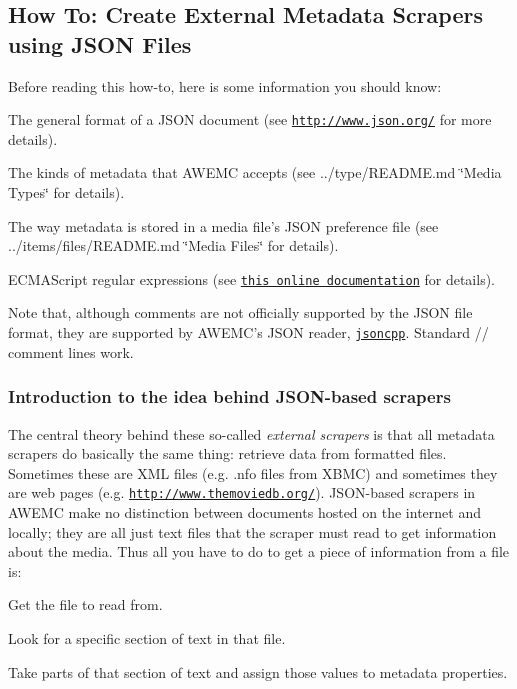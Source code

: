 \subsection*{How To\-: Create External Metadata Scrapers using J\-S\-O\-N Files}

Before reading this how-\/to, here is some information you should know\-:


\begin{DoxyItemize}
\item The general format of a J\-S\-O\-N document (see \href{http://www.json.org/}{\tt http\-://www.\-json.\-org/} for more details).
\item The kinds of metadata that A\-W\-E\-M\-C accepts (see ../type/\-R\-E\-A\-D\-M\-E.md \char`\"{}\-Media Types\char`\"{} for details).
\item The way metadata is stored in a media file's J\-S\-O\-N preference file (see ../items/files/\-R\-E\-A\-D\-M\-E.md \char`\"{}\-Media Files\char`\"{} for details).
\item E\-C\-M\-A\-Script regular expressions (see \href{http://www.cplusplus.com/reference/regex/ECMAScript/}{\tt this online documentation} for details).
\end{DoxyItemize}

Note that, although comments are not officially supported by the J\-S\-O\-N file format, they are supported by A\-W\-E\-M\-C's J\-S\-O\-N reader, \href{http://jsoncpp.sourceforge.net}{\tt jsoncpp}. Standard {\ttfamily // comment} lines work.

\subsubsection*{Introduction to the idea behind J\-S\-O\-N-\/based scrapers}

The central theory behind these so-\/called {\itshape external scrapers} is that all metadata scrapers do basically the same thing\-: retrieve data from formatted files. Sometimes these are X\-M\-L files (e.\-g. .nfo files from X\-B\-M\-C) and sometimes they are web pages (e.\-g. \href{http://www.themoviedb.org/}{\tt http\-://www.\-themoviedb.\-org/}). J\-S\-O\-N-\/based scrapers in A\-W\-E\-M\-C make no distinction between documents hosted on the internet and locally; they are all just text files that the scraper must read to get information about the media. Thus all you have to do to get a piece of information from a file is\-:


\begin{DoxyEnumerate}
\item Get the file to read from.
\item Look for a specific section of text in that file.
\item Take parts of that section of text and assign those values to metadata properties.
\end{DoxyEnumerate}

